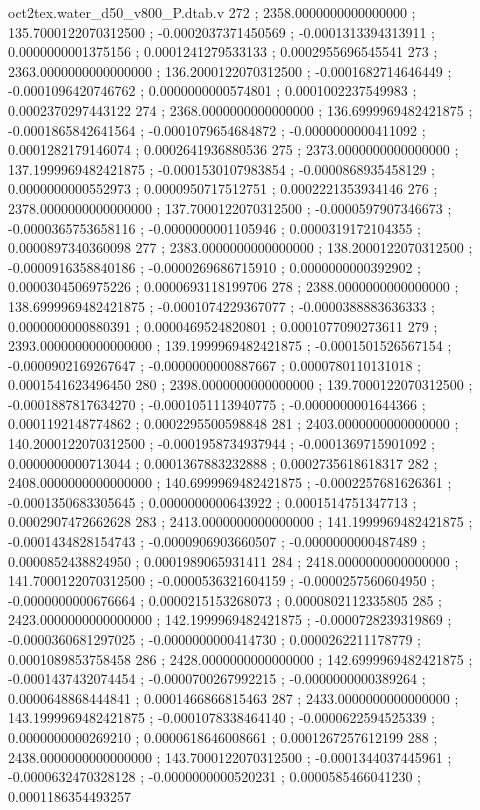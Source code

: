 \begin{filecontents}[overwrite]{oct2tex.water_d50_v800_P.dtab.v}
272 ; 2358.0000000000000000 ; 135.7000122070312500 ; -0.0002037371450569 ; -0.0001313394313911 ; 0.0000000001375156 ; 0.0001241279533133 ; 0.0002955696545541
273 ; 2363.0000000000000000 ; 136.2000122070312500 ; -0.0001682714646449 ; -0.0001096420746762 ; 0.0000000000574801 ; 0.0001002237549983 ; 0.0002370297443122
274 ; 2368.0000000000000000 ; 136.6999969482421875 ; -0.0001865842641564 ; -0.0001079654684872 ; -0.0000000000411092 ; 0.0001282179146074 ; 0.0002641936880536
275 ; 2373.0000000000000000 ; 137.1999969482421875 ; -0.0001530107983854 ; -0.0000868935458129 ; 0.0000000000552973 ; 0.0000950717512751 ; 0.0002221353934146
276 ; 2378.0000000000000000 ; 137.7000122070312500 ; -0.0000597907346673 ; -0.0000365753658116 ; -0.0000000001105946 ; 0.0000319172104355 ; 0.0000897340360098
277 ; 2383.0000000000000000 ; 138.2000122070312500 ; -0.0000916358840186 ; -0.0000269686715910 ; 0.0000000000392902 ; 0.0000304506975226 ; 0.0000693118199706
278 ; 2388.0000000000000000 ; 138.6999969482421875 ; -0.0001074229367077 ; -0.0000388883636333 ; 0.0000000000880391 ; 0.0000469524820801 ; 0.0001077090273611
279 ; 2393.0000000000000000 ; 139.1999969482421875 ; -0.0001501526567154 ; -0.0000902169267647 ; -0.0000000000887667 ; 0.0000780110131018 ; 0.0001541623496450
280 ; 2398.0000000000000000 ; 139.7000122070312500 ; -0.0001887817634270 ; -0.0001051113940775 ; -0.0000000001644366 ; 0.0001192148774862 ; 0.0002295500598848
281 ; 2403.0000000000000000 ; 140.2000122070312500 ; -0.0001958734937944 ; -0.0001369715901092 ; 0.0000000000713044 ; 0.0001367883232888 ; 0.0002735618618317
282 ; 2408.0000000000000000 ; 140.6999969482421875 ; -0.0002257681626361 ; -0.0001350683305645 ; 0.0000000000643922 ; 0.0001514751347713 ; 0.0002907472662628
283 ; 2413.0000000000000000 ; 141.1999969482421875 ; -0.0001434828154743 ; -0.0000906903660507 ; -0.0000000000487489 ; 0.0000852438824950 ; 0.0001989065931411
284 ; 2418.0000000000000000 ; 141.7000122070312500 ; -0.0000536321604159 ; -0.0000257560604950 ; -0.0000000000676664 ; 0.0000215153268073 ; 0.0000802112335805
285 ; 2423.0000000000000000 ; 142.1999969482421875 ; -0.0000728239319869 ; -0.0000360681297025 ; -0.0000000000414730 ; 0.0000262211178779 ; 0.0001089853758458
286 ; 2428.0000000000000000 ; 142.6999969482421875 ; -0.0001437432074454 ; -0.0000700267992215 ; -0.0000000000389264 ; 0.0000648868444841 ; 0.0001466866815463
287 ; 2433.0000000000000000 ; 143.1999969482421875 ; -0.0001078338464140 ; -0.0000622594525339 ; 0.0000000000269210 ; 0.0000618646008661 ; 0.0001267257612199
288 ; 2438.0000000000000000 ; 143.7000122070312500 ; -0.0001344037445961 ; -0.0000632470328128 ; -0.0000000000520231 ; 0.0000585466041230 ; 0.0001186354493257

\end{filecontents}
